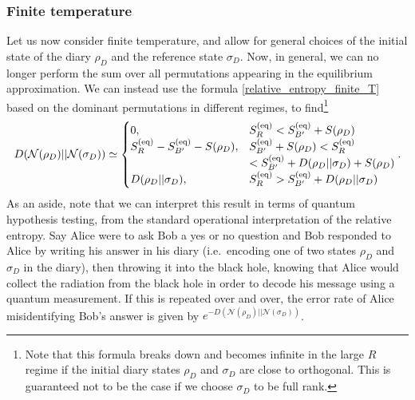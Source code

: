 \documentclass[a4paper,11pt]{article}
\begin{document}
\begin{enumerate}
\subsubsection{Finite temperature} 



Let us now consider finite temperature, and allow for general choices of the initial state of the diary $\rho_D$ and the reference state $\sigma_D$. Now, in general, we can no longer perform the sum over all permutations appearing in the equilibrium approximation. We can instead use the formula \eqref{relative_entropy_finite_T} based on the dominant permutations in different regimes, to find\footnote{Note that this formula breaks down and becomes infinite in the large $R$ regime if the initial diary states $\rho_D$ and $\sigma_D$ are close to orthogonal. This is guaranteed not to be the case if we choose $\sigma_D$ to be full rank.}
\begin{align}
 D(\mathcal{N}(\rho_D) || 
 \mathcal{N}(\sigma_D) ) \simeq \begin{cases}
 0 ,& S_{R}^{\rm (eq)} <S_{B'}^{\rm (eq)} + S(\rho_D)
 \\
 S_{R}^{\rm (eq)} - S_{B'}^{\rm (eq)} - S(\rho_D), & S_{B'}^{\rm (eq)} + S(\rho_D) < S_{R}^{\rm (eq)} \\
 & <S_{B'}^{\rm (eq)} +D(\rho_D \lvert \rvert \sigma_D) + S(\rho_D)
 \\
 D(\rho_D \lvert \rvert \sigma_D), & S_{R}^{\rm (eq)}> S_{B'}^{\rm (eq)} +D(\rho_D \lvert \rvert \sigma_D)
 \end{cases}.
 \label{relative_entropy_can}
\end{align}
As an aside, note that we can interpret this result in terms of quantum hypothesis testing, from the standard operational interpretation of the relative entropy. Say Alice were to ask Bob a yes or no question and Bob responded to Alice by writing his answer in his diary (i.e.~encoding one of two states $\rho_D$ and $\sigma_D$ in the diary), then throwing it into the black hole, knowing that Alice would collect the radiation from the black hole in order to decode his message using a quantum measurement. If this is repeated over and over, the error rate of Alice misidentifying Bob's answer is given by $e^{-D(\mathcal{N}(\rho_D) || 
 \mathcal{N}(\sigma_D))}$.


\end{enumerate}
\end{document}
